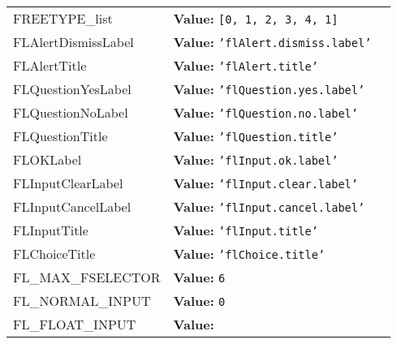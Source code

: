 \begin{longtable}{|p{\varnamewidth}|p{\vardescrwidth}|l}
\cline{1-2}
\raggedright F\-R\-E\-E\-T\-Y\-P\-E\-\_\-l\-i\-s\-t\- & \raggedright \textbf{Value:} 
{\tt \texttt{[}0\texttt{, }1\texttt{, }2\texttt{, }3\texttt{, }4\texttt{, }1\texttt{]}}&\\
\cline{1-2}
\raggedright F\-L\-A\-l\-e\-r\-t\-D\-i\-s\-m\-i\-s\-s\-L\-a\-b\-e\-l\- & \raggedright \textbf{Value:} 
{\tt \texttt{'}\texttt{flAlert.dismiss.label}\texttt{'}}&\\
\cline{1-2}
\raggedright F\-L\-A\-l\-e\-r\-t\-T\-i\-t\-l\-e\- & \raggedright \textbf{Value:} 
{\tt \texttt{'}\texttt{flAlert.title}\texttt{'}}&\\
\cline{1-2}
\raggedright F\-L\-Q\-u\-e\-s\-t\-i\-o\-n\-Y\-e\-s\-L\-a\-b\-e\-l\- & \raggedright \textbf{Value:} 
{\tt \texttt{'}\texttt{flQuestion.yes.label}\texttt{'}}&\\
\cline{1-2}
\raggedright F\-L\-Q\-u\-e\-s\-t\-i\-o\-n\-N\-o\-L\-a\-b\-e\-l\- & \raggedright \textbf{Value:} 
{\tt \texttt{'}\texttt{flQuestion.no.label}\texttt{'}}&\\
\cline{1-2}
\raggedright F\-L\-Q\-u\-e\-s\-t\-i\-o\-n\-T\-i\-t\-l\-e\- & \raggedright \textbf{Value:} 
{\tt \texttt{'}\texttt{flQuestion.title}\texttt{'}}&\\
\cline{1-2}
\raggedright F\-L\-O\-K\-L\-a\-b\-e\-l\- & \raggedright \textbf{Value:} 
{\tt \texttt{'}\texttt{flInput.ok.label}\texttt{'}}&\\
\cline{1-2}
\raggedright F\-L\-I\-n\-p\-u\-t\-C\-l\-e\-a\-r\-L\-a\-b\-e\-l\- & \raggedright \textbf{Value:} 
{\tt \texttt{'}\texttt{flInput.clear.label}\texttt{'}}&\\
\cline{1-2}
\raggedright F\-L\-I\-n\-p\-u\-t\-C\-a\-n\-c\-e\-l\-L\-a\-b\-e\-l\- & \raggedright \textbf{Value:} 
{\tt \texttt{'}\texttt{flInput.cancel.label}\texttt{'}}&\\
\cline{1-2}
\raggedright F\-L\-I\-n\-p\-u\-t\-T\-i\-t\-l\-e\- & \raggedright \textbf{Value:} 
{\tt \texttt{'}\texttt{flInput.title}\texttt{'}}&\\
\cline{1-2}
\raggedright F\-L\-C\-h\-o\-i\-c\-e\-T\-i\-t\-l\-e\- & \raggedright \textbf{Value:} 
{\tt \texttt{'}\texttt{flChoice.title}\texttt{'}}&\\
\cline{1-2}
\raggedright F\-L\-\_\-M\-A\-X\-\_\-F\-S\-E\-L\-E\-C\-T\-O\-R\- & \raggedright \textbf{Value:} 
{\tt 6}&\\
\cline{1-2}
\raggedright F\-L\-\_\-N\-O\-R\-M\-A\-L\-\_\-I\-N\-P\-U\-T\- & \raggedright \textbf{Value:} 
{\tt 0}&\\
\cline{1-2}
\raggedright F\-L\-\_\-F\-L\-O\-A\-T\-\_\-I\-N\-P\-U\-T\- & \raggedright \textbf{Value:} 

\end{longtable}
